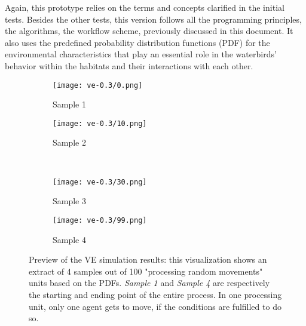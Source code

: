 Again, this prototype relies on the terms and concepts clarified in the initial tests. Besides the other tests, this version follows all the programming principles, the algorithms, the workflow scheme, previously discussed in this document. It also uses the predefined probability distribution functions (PDF) for the environmental characteristics that play an essential role in the waterbirds' behavior within the habitats and their interactions with each other.

\begin{figure}[h!]
    \centering
    \begin{subfigure}[b]{0.4\linewidth}
      \texttt{[image: ve-0.3/0.png]}
      \caption{Sample 1}
    \end{subfigure}
    \begin{subfigure}[b]{0.4\linewidth}
      \texttt{[image: ve-0.3/10.png]}
      \caption{Sample 2}
    \end{subfigure} \\ [2ex]
    \begin{subfigure}[b]{0.4\linewidth}
      \texttt{[image: ve-0.3/30.png]}
      \caption{Sample 3}
    \end{subfigure}
    \begin{subfigure}[b]{0.4\linewidth}
      \texttt{[image: ve-0.3/99.png]}
      \caption{Sample 4}
    \end{subfigure}
    \caption{Preview of the VE simulation results: this visualization shows an extract of 4 samples out of 100 "processing random movements" units based on the PDFs. \emph{Sample 1} and \emph{Sample 4} are respectively the starting and ending point of the entire process. In one processing unit, only one agent gets to move, if the conditions are fulfilled to do so. }
    \label{fig:ve-prototype}
\end{figure}

